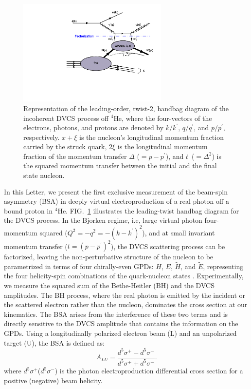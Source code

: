 \documentclass[twocolumn,nofootinbib,showpacs,prl,superscriptaddress,secnumarabic,amssymb,nobibnotes,aps,floatfix]{revtex4}
\begin{document}
\begin{figure}[tb]
\includegraphics[width=7.5cm]{figs/handbag_incoherent.pdf}
\caption{Representation of the leading-order, twist-2, handbag diagram of the 
   incoherent DVCS process off $^4$He, where the four-vectors of the electrons, 
   photons, and protons are denoted by $k/k^\prime$, $q/q^\prime$, and 
   $p/p^\prime$, respectively. $x+\xi$ is the nucleon’s longitudinal momentum 
   fraction carried by the struck quark, 2$\xi$ is the longitudinal momentum 
   fraction of the momentum transfer $\Delta$ ($= p - p^\prime$), and 
   $t$~($=\Delta^2$) is the squared momentum transfer between the initial and
   the final state nucleon.}
\label{fig:diags}
\end{figure}

In this Letter, we present the first exclusive measurement of the beam-spin 
asymmetry (BSA) in deeply virtual electroproduction of a real photon off a bound 
proton in $^{4}$He. FIG.~\ref{fig:diags} illustrates the leading-twist handbag 
diagram for the DVCS process. In the Bjorken regime, i.e, large virtual photon 
four-momentum squared ($Q^{2}=-q^2=-(k-k^\prime)^2$), and at small invariant 
momentum transfer ($t=(p-p^\prime)^2$), the DVCS scattering process can be 
factorized, leaving the non-perturbative structure of the nucleon to be 
parametrized in terms of four chirally-even GPDs: $H$, $E$, $\widetilde{H}$, 
and $\widetilde{E}$, representing the four helicity-spin combinations of the 
quark-nucleon states \cite{Freund_Collins,Ji_Osborne}. Experimentally, we 
measure the squared sum of the Bethe-Heitler (BH) and the DVCS amplitudes. The 
BH process, where the real photon is emitted by the incident or the scattered 
electron rather than the nucleon, dominates the cross section at our 
kinematics. The BSA arises from the interference of these two terms and is 
directly sensitive to the DVCS amplitude that contains the information on the 
GPDs. Using a longitudinally polarized electron beam (L) and an unpolarized 
target (U), the BSA is defined as:
\begin{equation}
  A_{LU} = \frac{d^{5}\sigma^{+} - d^{5}\sigma^{-} }
                {d^{5}\sigma^{+} + d^{5}\sigma^{-}}.
    \label{BSA_equation}
  \end{equation}
where $d^{5}\sigma^{+}$($d^{5}\sigma^{-}$) is the photon electroproduction 
differential cross section for a positive (negative) beam helicity. 
\end{document}
